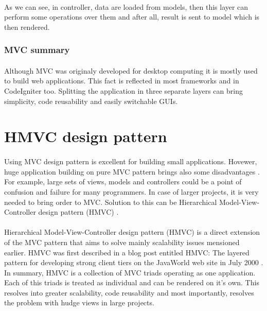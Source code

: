 \paragraph{}
As we can see, in controller, data are loaded from models, then this layer can perform some operations over them and after all, result is sent to model which is then rendered.

\subsubsection{MVC summary}
\paragraph{}
Although MVC was originaly developed for desktop computing \cite{mvc} it is mostly used to build web applications. This fact is reflected in most frameworks and in CodeIgniter too. Splitting the application in three separate layers can bring simplicity, code reusability and easily switchable GUIs.

\section{HMVC design pattern}
\paragraph{}
Using MVC design pattern is excellent for building small applications. Hovewer, huge application building on pure MVC pattern brings also some disadvantages \cite{culik}. For example, large sets of views, models and controllers could be a point of confusion and failure for many programmers. In case of larger projects, it is very needed to bring order to MVC. Solution to this can be Hierarchical Model-View-Controller design pattern (HMVC) \cite{hmvc}.

\paragraph{}
Hierarchical Model-View-Controller design pattern (HMVC) is a direct extension of the MVC pattern that aims to solve mainly scalability issues mensioned earlier. HMVC was first described in a blog post entitled HMVC: The layered pattern for developing strong client tiers on the JavaWorld web site in July 2000 \cite{hmvc}. In summary, HMVC is a collection of MVC triads operating as one application. Each of this triads is treated as individual and can be rendered on it's own. This resolves into greater scalability, code reusability and most importantly, resolves the problem with hudge views in large projects.

